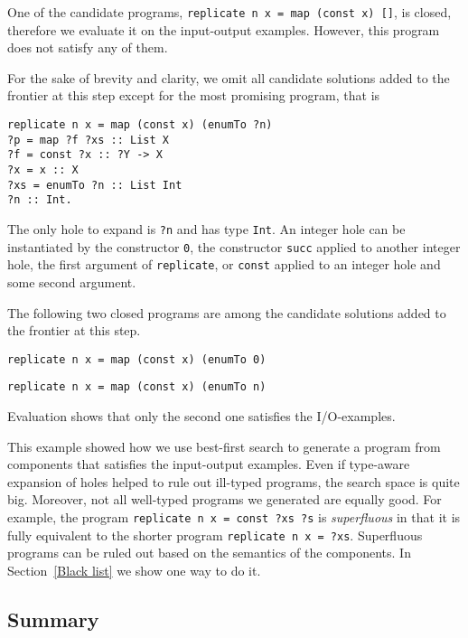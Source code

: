 One of the candidate programs, \lstinline?replicate n x = map (const x) []?, is closed, therefore we evaluate it on the input-output examples. However, this program does not satisfy any of them.

For the sake of brevity and clarity, we omit all candidate solutions added to the frontier at this step except for the most promising program, that is
\begin{lstlisting}[style=plain]
replicate n x = map (const x) (enumTo ?n)
?p = map ?f ?xs :: List X
?f = const ?x :: ?Y -> X
?x = x :: X
?xs = enumTo ?n :: List Int
?n :: Int.
\end{lstlisting}
The only hole to expand is \lstinline!?n! and has type \lstinline!Int!. An integer hole can be instantiated by the constructor \lstinline?0?, the constructor \lstinline?succ? applied to another integer hole, the first argument of \lstinline?replicate?, or \lstinline?const? applied to an integer hole and some second argument.

The following two closed programs are among the candidate solutions added to the frontier at this step.
\begin{lstlisting}
replicate n x = map (const x) (enumTo 0)
\end{lstlisting}
\begin{lstlisting}
replicate n x = map (const x) (enumTo n)
\end{lstlisting}
Evaluation shows that only the second one satisfies the I/O-examples.

This example showed how we use best-first search to generate a program from components that satisfies the input-output examples. Even if type-aware expansion of holes helped to rule out ill-typed programs, the search space is quite big. Moreover, not all well-typed programs we generated are equally good. For example, the program \lstinline!replicate n x = const ?xs ?s! is \emph{superfluous} in that it is fully equivalent to the shorter program \lstinline!replicate n x = ?xs!. Superfluous programs can be ruled out based on the semantics of the components. In Section~\ref{Black list} we show one way to do it.

\subsection{Summary}

